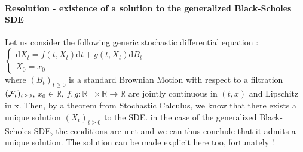 \paragraph{Resolution - existence of a solution to the generalized Black-Scholes SDE}
Let us consider the following generic stochastic differential equation : \\
$\left\{
\begin{array}{l}
\mathrm{d}X_t = f(t,X_t) \mathrm{d}t + g(t,X_t) \mathrm{d}B_t\\
X_0 = x_0
\end{array}
\right.$ \\ where $(B_t)_{t \ge 0}$ is a standard Brownian Motion with respect to a filtration $({\cal{F}}_t)_{t \ge 0}$, $x_0 \in \mathbb{R}$, $f,g : \mathbb{R}_{+} \times \mathbb{R} \longrightarrow \mathbb{R}$ are jointly continuous in $(t,x)$ and Lipschitz in x. Then, by a theorem from Stochastic Calculus, we know that there exists a unique solution $(X_t)_{t \ge 0}$ to the SDE. in the case of the generalized Black-Scholes SDE, the conditions are met and we can thus conclude that it admits a unique solution. The solution can be made explicit here too, fortunately !
